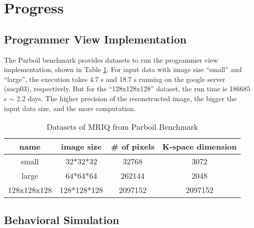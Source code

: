 \vspace{-4mm}
\section{Progress}

\subsection{Programmer View Implementation}
The Parboil benchmark provides datasets to run the programmer view implementation, 
shown in Table \ref{tab-1}. For input data with image size ``small'' and ``large'', 
the execution takes 4.7 s and 18.7 s running on the google server (socp03), respectively. 
But for the ``128x128x128'' dataset, the run time is 186685 s $ \sim$ 2.2 days. The higher 
precision of the reconstructed image, the bigger the input data size, and the more computation.

\begin{table}[h!]
    \centering
    \begin{tabular}{c|c|c|c}
    \hline
       name  & image size & \# of pixels & K-space dimension  \\
    \hline
        small  & 32*32*32 & 32768 & 3072 \\
        large & 64*64*64 & 262144 & 2048\\
        128x128x128 & 128*128*128 & 2097152 & 2097152\\
        \hline
    \end{tabular}
    \caption{Datasets of MRIQ from Parboil Benchmark}
    \label{tab-1}
\end{table}

\subsection{Behavioral Simulation}

